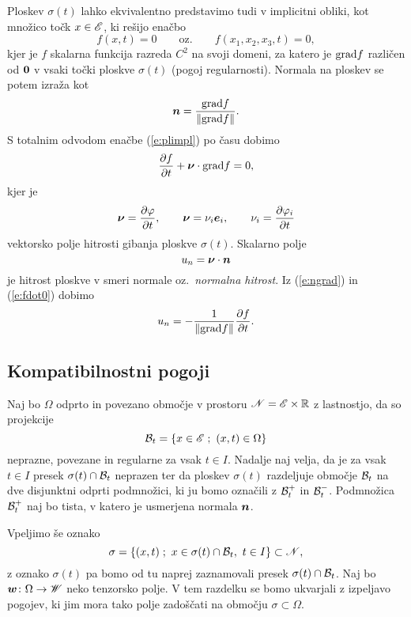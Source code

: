 Ploskev $\sigma(t)$ lahko ekvivalentno predstavimo tudi v 
implicitni obliki, kot množico točk $x\in\mathscr E$, ki rešijo enačbo
\begin{equation} \label{e:plimpl}
	f(x,t)=0\qquad\textrm{oz.}\qquad f(x_1,x_2,x_3,t)=0,
\end{equation}
kjer je $f$ skalarna funkcija razreda $C^2$ na svoji domeni,
za katero je $\mathrm{grad} f$ različen od $\boldsymbol 0$ v vsaki točki ploskve $\sigma(t)$
(pogoj regularnosti). Normala na ploskev se potem izraža kot
\begin{equation} \label{e:ngrad}
	\boldsymbol n=\frac{\mathrm{grad} f}{\|\mathrm{grad} f\|}.
\end{equation}
S totalnim odvodom enačbe (\ref{e:plimpl}) po času dobimo
\begin{equation} \label{e:fdot0}
	\frac{\partial f}{\partial t}+\boldsymbol \nu\cdot\mathrm{grad} f = 0,
\end{equation}
kjer je
\[
	\boldsymbol \nu=\frac{\partial\varphi}{\partial t},\qquad
	\boldsymbol \nu=\nu_i\boldsymbol e_i,\qquad \nu_i=\frac{\partial\varphi_i}{\partial t}
\]
vektorsko polje hitrosti gibanja ploskve $\sigma(t)$. Skalarno polje
\[ u_n=\boldsymbol \nu\cdot\boldsymbol n \]
je hitrost ploskve v smeri normale oz.~\emph{normalna hitrost}.
Iz (\ref{e:ngrad}) in (\ref{e:fdot0}) dobimo
\[ u_n=-\frac{1}{\|\mathrm{grad} f\|}\frac{\partial f}{\partial t}. \]


\subsection{Kompatibilnostni pogoji}


Naj bo $\Omega$ odprto in povezano območje v prostoru $\mathscr N=\mathscr E\times\mathbb R$ z lastnostjo, da so projekcije
\[ \B_t=\{x\in\E\;;\ (x,t)\in\Omega\} \]
neprazne, povezane in regularne za vsak $t\in I$. Nadalje naj velja, da je za vsak $t\in I$
presek $\sigma(t)\cap\mathcal B_t$ neprazen ter da ploskev $\sigma(t)$ razdeljuje območje
$\mathcal B_t$ na dve disjunktni odprti podmnožici, ki ju bomo označili z $\mathcal B_t^+$ in $\mathcal B_t^-$.
Podmnožica $\mathcal B_t^+$ naj bo tista, v katero je usmerjena normala $\boldsymbol n$.

Vpeljimo še oznako
\[
	\sigma=\{(x,t)\;;\ x\in\sigma(t)\cap \B_t,\ t\in I\}\subset\N,
\]
z oznako $\sigma(t)$ pa bomo od tu naprej zaznamovali presek $\sigma(t)\cap\mathcal B_t$.
Naj bo $\boldsymbol w\colon\Omega\to\mathscr W$ neko tenzorsko polje. V tem razdelku se bomo ukvarjali
z izpeljavo pogojev, ki jim mora tako polje zadoščati na območju $\sigma\subset\Omega$.

